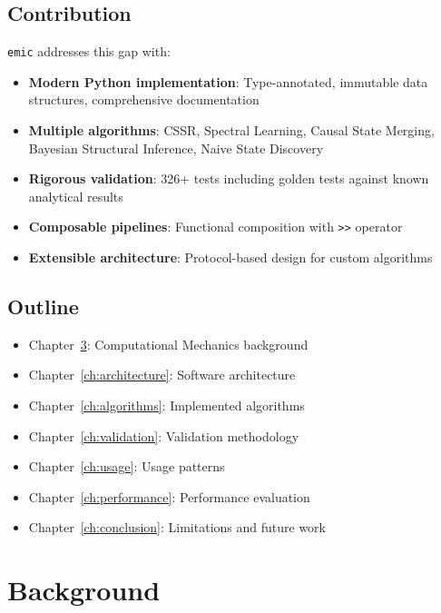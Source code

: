 \documentclass[11pt,a4paper]{report}
\theoremstyle{definition}
\theoremstyle{plain}
\newcommand{\emic}{\texttt{emic}}
\begin{document}
\section{Contribution}

\emic{} addresses this gap with:

\begin{itemize}
    \item \textbf{Modern Python implementation}: Type-annotated, immutable data structures, comprehensive documentation
    \item \textbf{Multiple algorithms}: CSSR, Spectral Learning, Causal State Merging, Bayesian Structural Inference, Naive State Discovery
    \item \textbf{Rigorous validation}: 326+ tests including golden tests against known analytical results
    \item \textbf{Composable pipelines}: Functional composition with \texttt{>>} operator
    \item \textbf{Extensible architecture}: Protocol-based design for custom algorithms
\end{itemize}

\section{Outline}

\begin{itemize}
    \item Chapter~\ref{ch:background}: Computational Mechanics background
    \item Chapter~\ref{ch:architecture}: Software architecture
    \item Chapter~\ref{ch:algorithms}: Implemented algorithms
    \item Chapter~\ref{ch:validation}: Validation methodology
    \item Chapter~\ref{ch:usage}: Usage patterns
    \item Chapter~\ref{ch:performance}: Performance evaluation
    \item Chapter~\ref{ch:conclusion}: Limitations and future work
\end{itemize}

\chapter{Background}
\label{ch:background}
\end{document}
